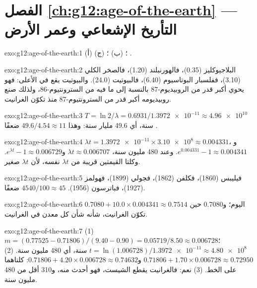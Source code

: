 \section*{الفصل \ref{ch:g12:age-of-the-earth} --- التأريخ الإشعاعي وعمر الأرض}

\begin{solution}{exo:g12:age-of-the-earth:1}
(أ) ؛ (ب) ؛ (ج) .
\end{solution}

\begin{solution}{exo:g12:age-of-the-earth:2}
البلاجيوكليز (0.35)، فالهورنبلند (1.20)، فالصخر الكلي (3.10)، ففلسبار البوتاسيوم (6.40)،
فالبيوتيت (24.0). والبيوتيت يقع في الأعلى: فهو يحوي أكبر قدر من الروبيديوم-87 بالنسبة إلى
ما فيه من السترونتيوم-86، ولذلك صنع روبيديومه أكبر قدر من السترونتيوم-87 منذ
تكوّن الغرانيت.
\end{solution}

\begin{solution}{exo:g12:age-of-the-earth:3}
$T = \ln 2/\lambda = 0.6931/\num{1.3972e-11} \approx \num{4.96e10}$ سنة،
أي 49.6 مليار سنة: وهذا $49.6/4.54 \approx 11$ ضعفًا .
\end{solution}

\begin{solution}{exo:g12:age-of-the-earth:4}
$\lambda t = \num{1.3972e-11} \times \num{3.10e8} \approx 0.004331$،
و$e^{0.004331} - 1 \approx 0.004341$. وعند 480 مليون سنة، $\lambda t
\approx 0.006707$ و$e^{\lambda t} - 1 \approx 0.006729$. وكلتا القيمتين قريبة من
$\lambda t$ نفسه، لأن $\lambda t$ صغير.
\end{solution}

\begin{solution}{exo:g12:age-of-the-earth:5}
فيليبس (1860)، فكلفن (1862)، فجولي (1899)، فهولمز (1927)، فباترسون
(1956). $4540/100 \approx 45$ ضعفًا.
\end{solution}

\begin{solution}{exo:g12:age-of-the-earth:6}
$0.7080 + 10.0 \times 0.004341 \approx 0.7514$ اليوم؛ و0.7080 حين تكوّن
الغرانيت، شأنه شأن كل معدن في الغرانيت.
\end{solution}

\begin{solution}{exo:g12:age-of-the-earth:7}
(1) $m = (0.77525 - 0.71806)/(9.40 - 0.90) = 0.05719/8.50 \approx 0.006728$؛
$t = \ln(1.006728)/\num{1.3972e-11} \approx \num{4.80e8}$ سنة، أي 480 مليون
سنة. (2) $0.71806 + 1.70 \times 0.006728 \approx 0.72950$ و$0.71806 + 4.20
\times 0.006728 \approx 0.74632$: كلتاهما على الخط. (3) نعم: فالغرانيت يقطع
الشيست، فهو أحدث منه، و310 أقل من 480 مليون سنة.
\end{solution}

